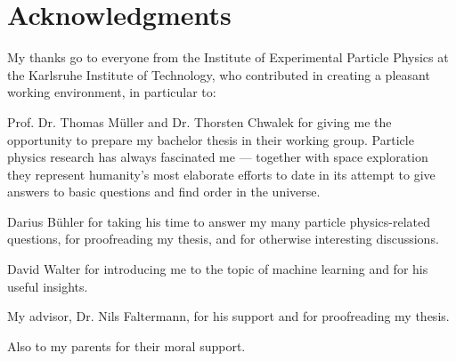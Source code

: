 \chapter*{Acknowledgments}

My thanks go to everyone from the Institute of Experimental Particle Physics at the Karlsruhe Institute of Technology, who contributed in creating a pleasant working environment, in particular to:

Prof. Dr. Thomas Müller and Dr. Thorsten Chwalek for giving me the opportunity to prepare my bachelor thesis in their working group. Particle physics research has always fascinated me --- together with space exploration they represent humanity's most elaborate efforts to date in its attempt to give answers to basic questions and find order in the universe.

Darius Bühler for taking his time to answer my many particle physics-related questions, for proofreading my thesis, and for otherwise interesting discussions.

David Walter for introducing me to the topic of machine learning and for his useful insights.

My advisor, Dr. Nils Faltermann, for his support and for proofreading my thesis.

Also to my parents for their moral support.